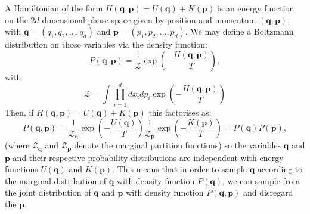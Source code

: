 \documentclass[12pt]{article}
\begin{document}
            A Hamiltonian of the form $H\left(\bm{q},\bm{p}\right)=U\left(\bm{q}\right)+K\left(\bm{p}\right)$ is an energy function on the $2d$-dimensional phase space given by position and momentum $\left(\bm{q},\bm{p}\right)$, with $\bm{q} = \left(q_{1},q_{2},\dots,q_{d}\right)$ and $\bm{p} = \left(p_{1},p_{2},\dots,p_{d}\right)$. We may define a Boltzmann distribution on those variables via the density function:
            \begin{equation}
                \label{eq:BoltzmannDistributionXP}
                P\left(\bm{q},\bm{p}\right) = \frac{1}{\mathcal{Z}}\exp{\left(-\frac{H\left(\bm{q},\bm{p}\right)}{T} \right)},
            \end{equation}
            with 
            \begin{equation}
                \mathcal{Z} = \int\prod_{i=1}^{d}dx_{i}dp_{i} \exp{\left(-\frac{H\left(\bm{q},\bm{p}\right)}{T}\right)}
            \end{equation}
            Then, if $H\left(\bm{q},\bm{p}\right) = U\left(\bm{q}\right) + K\left(\bm{p}\right)$ this factorises as:
            \begin{equation}
                \label{eq:BoltzmannDistributionXPFactorised}
                P\left(\bm{q},\bm{p}\right) = \frac{1}{\mathcal{Z}_{\bm{q}}}\exp{\left(-\frac{U\left(\bm{q}\right)}{T} \right)}\frac{1}{\mathcal{Z}_{\bm{p}}}\exp{\left(-\frac{K\left(\bm{p}\right)}{T} \right)} = P\left(\bm{q}\right) P\left(\bm{p}\right),
            \end{equation}
            (where $\mathcal{Z}_{\bm{q}}$ and $\mathcal{Z}_{\bm{p}}$ denote the marginal partition functions) so the variables $\bm{q}$ and $\bm{p}$ and their respective probability distributions are independent with energy functions $U\left(\bm{q}\right)$ and $K\left(\bm{p}\right)$. This means that in order to sample $\bm{q}$ according to the marginal distribution of $\bm{q}$ with density function $P\left(\bm{q}\right)$, we can sample from the joint distribution of $\bm{q}$ and $\bm{p}$ with density function $P\left(\bm{q},\bm{p}\right)$ and disregard the $\bm{p}$. 
\end{document}
